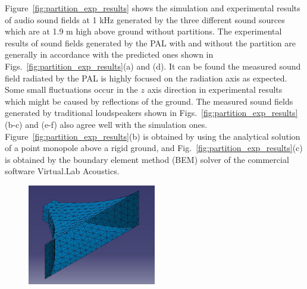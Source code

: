 Figure~\ref{fig:partition_exp_results} shows the simulation and experimental results of audio sound fields at 1 kHz generated by the three different sound sources which are at 1.9 m high above ground without partitions. 
The experimental results of sound fields generated by the PAL with and without the partition are generally in accordance with the predicted ones shown in Figs.~\ref{fig:partition_exp_results}(a) and (d). 
It can be found the measured sound field radiated by the PAL is highly focused on the radiation axis as expected. 
Some small fluctuations occur in the $z$ axis direction in experimental results which might be caused by reflections of the ground. 
The measured sound fields generated by traditional loudspeakers shown in Figs.~\ref{fig:partition_exp_results}(b-c) and (e-f) also agree well with the simulation ones. 
Figure~\ref{fig:partition_exp_results}(b) is obtained by using the analytical solution of a point monopole above a rigid ground, and Fig.~\ref{fig:partition_exp_results}(c) is obtained by the boundary element method (BEM) solver of the commercial software Virtual.Lab Acoustics. 

\begin{figure}[!htb]
    \centering
    \includegraphics[width = 0.5\textwidth]{fig/horn_20220519233959.jpg}
    \caption{}
    \label{fig:fd:jfsdoif}
\end{figure}

